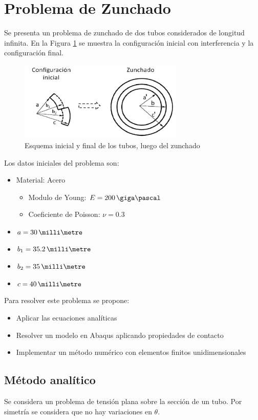 \section{Problema de Zunchado}
\graphicspath{{figures/}}
Se presenta un problema de zunchado de dos tubos considerados de longitud infinita. En la Figura \ref{fig:z1} se muestra la configuraci\'on inicial con interferencia y la configuraci\'on final.

\begin{figure}[!ht]
\centering
\includegraphics[width=0.7\textwidth]{zunchado1.png}
\caption{Esquema inicial y final de los tubos, luego del zunchado}
\label{fig:z1}
\end{figure}

Los datos iniciales del problema son:
\begin{itemize}
\item Material: Acero
\begin{itemize}
\item Modulo de Young: $ E=200\,\giga\pascal $
\item Coeficiente de Poisson: $ \nu=0.3 $
\end{itemize}
\item $ a=30\,\milli\metre $
\item $ b_1=35.2\,\milli\metre $
\item $ b_2=35\,\milli\metre $
\item $ c=40\,\milli\metre $
\end{itemize}

Para resolver este problema se propone:
\begin{itemize}
\item Aplicar las ecuaciones anal\'iticas
\item Resolver un modelo en Abaqus aplicando propiedades de contacto
\item Implementar un m\'etodo num\'erico con elementos finitos unidimensionales
\end{itemize}


\subsection{M\'etodo anal\'itico}
Se considera un problema de tensi\'on plana sobre la secci\'on de un tubo. Por simetr\'ia se considera que no hay variaciones en $ \theta $.

